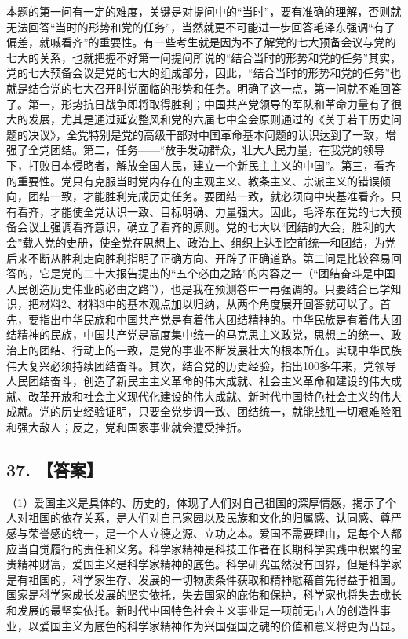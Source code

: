 \documentclass[UTF8,11pt]{ctexart}
\begin{document}
本题的第一问有一定的难度，关键是对提问中的“当时”，要有准确的理解，否则就无法回答“当时的形势和党的任务”，当然就更不可能进一步回答毛泽东强调“有了偏差，就喊看齐”的重要性。有一些考生就是因为不了解党的七大预备会议与党的七大的关系，也就把握不好第一问提问所说的“结合当时的形势和党的任务”其实，党的七大预备会议是党的七大的组成部分，因此，“结合当时的形势和党的任务”也就是结合党的七大召开时党面临的形势和任务。明确了这一点，第一问就不难回答了。第一，形势抗日战争即将取得胜利；中国共产党领导的军队和革命力量有了很大的发展，尤其是通过延安整风和党的六届七中全会原则通过的《关于若干历史问题的决议》，全党特别是党的高级干部对中国革命基本问题的认识达到了一致，增强了全党团结。第二，任务——“放手发动群众，壮大人民力量，在我党的领导下，打败日本侵略者，解放全国人民，建立一个新民主主义的中国”。第三，看齐的重要性。党只有克服当时党内存在的主观主义、教条主义、宗派主义的错误倾向，团结一致，才能胜利完成历史任务。要团结一致，就必须向中央基准看齐。只有看齐，才能使全党认识一致、目标明确、力量强大。因此，毛泽东在党的七大预备会议上强调看齐意识，确立了看齐的原则。党的七大以“团结的大会，胜利的大会”载人党的史册，使全党在思想上、政治上、组织上达到空前统一和团结，为党后来不断从胜利走向胜利指明了正确方向、开辟了正确道路。第二问是比较容易回答的，它是党的二十大报告提出的“五个必由之路”的内容之一（“团结奋斗是中国人民创造历史伟业的必由之路”），也是我在预测卷中一再强调的。只要结合已学知识，把材料2、材料3中的基本观点加以归纳，从两个角度展开回答就可以了。首先，要指出中华民族和中国共产党是有着伟大团结精神的。中华民族是有着伟大团结精神的民族，中国共产党是高度集中统一的马克思主义政党，思想上的统一、政治上的团结、行动上的一致，是党的事业不断发展壮大的根本所在。实现中华民族伟大复兴必须持续团结奋斗。其次，结合党的历史经验，指出100多年来，党领导人民团结奋斗，创造了新民主主义革命的伟大成就、社会主义革命和建设的伟大成就、改革开放和社会主义现代化建设的伟大成就、新时代中国特色社会主义的伟大成就。党的历史经验证明，只要全党步调一致、团结统一，就能战胜一切艰难险阻和强大敌人；反之，党和国家事业就会遭受挫折。


\subsection*{37. 【答案】}

（1）爱国主义是具体的、历史的，体现了人们对自己祖国的深厚情感，揭示了个人对祖国的依存关系，是人们对自己家园以及民族和文化的归属感、认同感、尊严感与荣誉感的统一，是一个人立德之源、立功之本。爱国不需要理由，是每个人都应当自觉履行的责任和义务。科学家精神是科技工作者在长期科学实践中积累的宝贵精神财富，爱国主义是科学家精神的底色。科学研究虽然没有国界，但是科学家是有祖国的，科学家生存、发展的一切物质条件获取和精神慰藉首先得益于祖国。国家是科学家成长发展的坚实依托，失去国家的庇佑和保护，科学家也将失去成长和发展的最坚实依托。新时代中国特色社会主义事业是一项前无古人的创造性事业，以爱国主义为底色的科学家精神作为兴国强国之魂的价值和意义将更为凸显。
\end{document}
